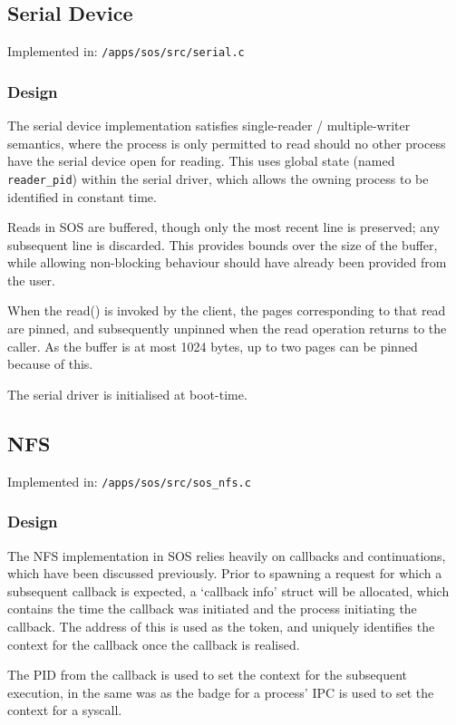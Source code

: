 \documentclass[a4paper,12pt]{article}
\begin{document}
\subsection{Serial Device}
Implemented in: \texttt{/apps/sos/src/serial.c}

\subsubsection{Design}
The serial device implementation satisfies single-reader / multiple-writer
semantics, where the process is only permitted to read should no other process
have the serial device open for reading.  This uses global state (named
\texttt{reader\_pid}) within the serial driver, which allows the owning process to be
identified in constant time.

Reads in SOS are buffered, though only the most recent line is preserved; any
subsequent line is discarded.  This provides bounds over the size of the
buffer, while allowing non-blocking behaviour should have already been
provided from the user.

When the read() is invoked by the client, the pages corresponding to that read
are pinned, and subsequently unpinned when the read operation returns to the
caller.  As the buffer is at most 1024 bytes, up to two pages can be pinned
because of this.

The serial driver is initialised at boot-time.

\subsection{NFS}
Implemented in: \texttt{/apps/sos/src/sos\_nfs.c}

\subsubsection{Design}
The NFS implementation in SOS relies heavily on callbacks and continuations,
which have been discussed previously.  Prior to spawning a request for which a
subsequent callback is expected, a `callback info' struct will be allocated,
which contains the time the callback was initiated and the process initiating
the callback.  The address of this is used as the token, and uniquely
identifies the context for the callback once the callback is realised.

The PID from the callback is used to set the context for the subsequent
execution, in the same was as the badge for a process' IPC is used to set the
context for a syscall.
\end{document}
